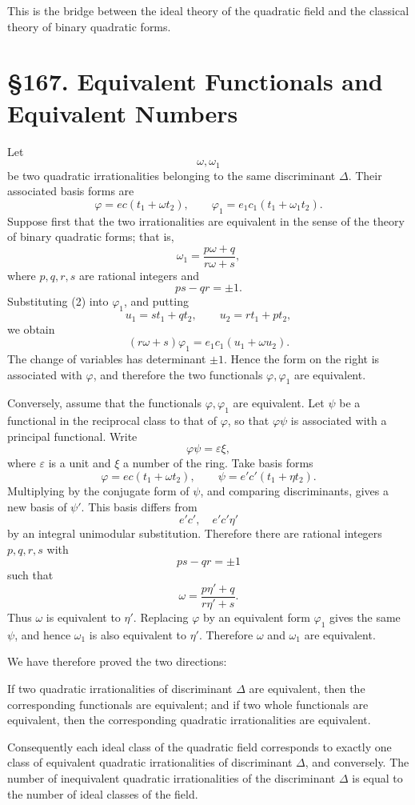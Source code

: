 \documentclass[12pt,a4paper]{article}
\newcommand{\webersection}[2]{\clearpage\section*{\S #1. #2}}
\newcommand{\eps}{\varepsilon}
\begin{document}
This is the bridge between the ideal theory of the quadratic field and the classical theory of binary quadratic forms.

\webersection{167}{Equivalent Functionals and Equivalent Numbers}

Let
\[
  \omega,\omega_1
\]
be two quadratic irrationalities belonging to the same discriminant \(\Delta\).  Their associated basis forms are
\[
  \varphi=ec(t_1+\omega t_2),\qquad
  \varphi_1=e_1c_1(t_1+\omega_1 t_2).
\tag{1}
\]
Suppose first that the two irrationalities are equivalent in the sense of the theory of binary quadratic forms; that is,
\[
  \omega_1=\frac{p\omega+q}{r\omega+s},
\tag{2}
\]
where \(p,q,r,s\) are rational integers and
\[
  ps-qr=\pm1.
\tag{3}
\]
Substituting (2) into \(\varphi_1\), and putting
\[
  u_1=st_1+qt_2,\qquad u_2=rt_1+pt_2,
\]
we obtain
\[
  (r\omega+s)\varphi_1=e_1c_1(u_1+\omega u_2).
\tag{4}
\]
The change of variables has determinant \(\pm1\).  Hence the form on the right is associated with \(\varphi\), and therefore the two functionals \(\varphi,\varphi_1\) are equivalent.

Conversely, assume that the functionals \(\varphi,\varphi_1\) are equivalent.  Let \(\psi\) be a functional in the reciprocal class to that of \(\varphi\), so that \(\varphi\psi\) is associated with a principal functional.  Write
\[
  \varphi\psi=\eps\xi,
\tag{5}
\]
where \(\eps\) is a unit and \(\xi\) a number of the ring.  Take basis forms
\[
  \varphi=ec(t_1+\omega t_2),\qquad
  \psi=e'c'(t_1+\eta t_2).
\tag{6}
\]
Multiplying by the conjugate form of \(\psi\), and comparing discriminants, gives a new basis of \(\psi'\).  This basis differs from
\[
  e'c',\quad e'c'\eta'
\]
by an integral unimodular substitution.  Therefore there are rational integers \(p,q,r,s\) with
\[
  ps-qr=\pm1
\tag{7}
\]
such that
\[
  \omega=\frac{p\eta'+q}{r\eta'+s}.
\tag{8}
\]
Thus \(\omega\) is equivalent to \(\eta'\).  Replacing \(\varphi\) by an equivalent form \(\varphi_1\) gives the same \(\psi\), and hence \(\omega_1\) is also equivalent to \(\eta'\).  Therefore \(\omega\) and \(\omega_1\) are equivalent.

We have therefore proved the two directions:

If two quadratic irrationalities of discriminant \(\Delta\) are equivalent, then the corresponding functionals are equivalent; and if two whole functionals are equivalent, then the corresponding quadratic irrationalities are equivalent.

Consequently each ideal class of the quadratic field corresponds to exactly one class of equivalent quadratic irrationalities of discriminant \(\Delta\), and conversely.  The number of inequivalent quadratic irrationalities of the discriminant \(\Delta\) is equal to the number of ideal classes of the field.
\end{document}
